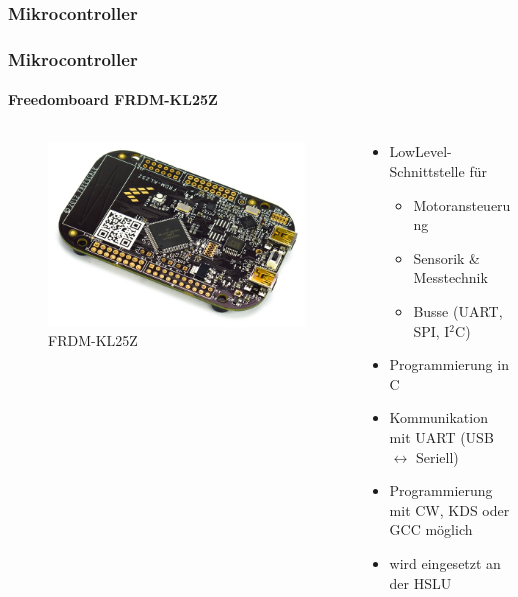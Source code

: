 \subsubsection{Mikrocontroller}
\begin{frame}
	\frametitle{Mikrocontroller\hfill{}\footnotesize \group}
	\framesubtitle{Freedomboard FRDM-KL25Z}
	\begin{columns}
		\begin{column}{0.5\textwidth}
			\begin{figure}
				\centering
				\includegraphics[width=1\textwidth]{../../fig/frdm-kl25z.jpg}
				\caption{FRDM-KL25Z}
			\end{figure}
		\end{column}
		\begin{column}{0.5\textwidth}
			\begin{itemize}
				\item LowLevel-Schnittstelle für
					\begin{itemize}
						\item Motoransteuerung
						\item Sensorik \& Messtechnik
						\item Busse (UART, SPI, I$^2$C)
					\end{itemize}
				\item Programmierung in C
				\item Kommunikation mit UART (USB $\leftrightarrow$ Seriell)
				\item Programmierung mit CW, KDS oder GCC möglich
				\item wird eingesetzt an der HSLU
			\end{itemize}
		\end{column}
	\end{columns}
\end{frame}

